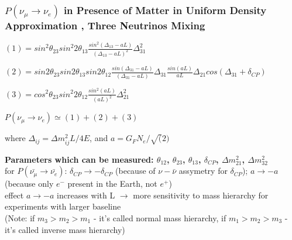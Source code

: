 \begin{frame}\frametitle{$P(\nu_\mu \rightarrow \nu_e)$ in Presence of Matter in Uniform Density Approximation  \cite{ref_LBNFdoc_volume-physics}, Three Neutrinos Mixing}
\scriptsize

\begin{center}
\scriptsize $ (1) = sin^2{\theta_{23}}sin^2{2\theta_{13}}\frac{sin^2(\Delta_{13}-aL)}{(\Delta_{13}-aL)^2}\Delta^2_{31}$\\
\end{center}

\begin{center}
\scriptsize $ (2) = sin2\theta_{23}sin2\theta_{13}sin2\theta_{12}\frac{sin(\Delta_{31}-aL)}{(\Delta_{31}-aL)}\Delta_{31}\frac{sin(aL)}{aL}\Delta_{21}cos(\Delta_{31}+\delta_{CP})$\\
\end{center}

\begin{center}
\scriptsize $ (3) = cos^2\theta_{23}sin^2{2\theta_{12}}\frac{sin^2(aL)}{(aL)^2}\Delta^2_{21}$\\
\end{center}

\begin{center}
\scriptsize $P(\nu_\mu \rightarrow \nu_e) \simeq (1) + (2) + (3)$\\
\end{center}

\begin{center}
\scriptsize where $\Delta_{ij}={\Delta}m^2_{ij}L/4E$, and $a={G_F}{N_e}/\sqrt(2)$\\
\end{center}

\scriptsize \textbf{Parameters which can be measured: $\theta_{12}$, $\theta_{23}$, $\theta_{13}$, $\delta_{CP}$, ${\Delta}m^2_{21}$, ${\Delta}m^2_{32}$} \\
\scriptsize for $P(\bar{\nu_\mu} \rightarrow \bar{\nu_e})$: $\delta_{CP} \rightarrow -\delta_{CP}$ ({\tiny because of $\nu-\bar{\nu}$ assymetry for $\delta_{CP}$}); $a \rightarrow -a$ ({\tiny because only $e^-$ present in the Earth, not $e^+$})\\
\scriptsize effect $a \rightarrow -a$ increases with L $\rightarrow$ more sensitivity to mass hierarchy for experiments with larger baseline\\
\tiny (Note: if $m_3>m_2>m_1$ - it's called normal mass hierarchy, if $m_1>m_2>m_3$ - it's called inverse mass hierarchy)\\

\end{frame}

